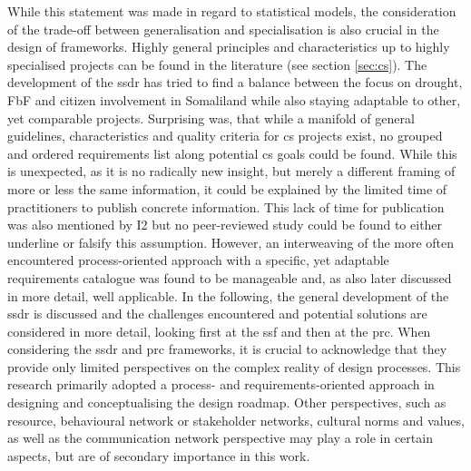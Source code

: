 While this statement was made in regard to statistical models, the consideration of the trade-off between generalisation and specialisation is also crucial in the design of frameworks. Highly general principles and characteristics up to highly specialised projects can be found in the literature (see section \ref{sec:cs}). The development of the \acrshort{ssdr} has tried to find a balance between the focus on drought, FbF and citizen involvement in Somaliland while also staying adaptable to other, yet comparable projects.\newline
Surprising was, that while a manifold of general guidelines, characteristics and quality criteria for \acrlong{cs} projects exist, no grouped and ordered requirements list along potential \acrshort{cs} goals could be found. While this is unexpected, as it is no radically new insight, but merely a different framing of more or less the same information, it could be explained by the limited time of practitioners to publish concrete information. This lack of time for publication was also mentioned by I2 but no peer-reviewed study could be found to either underline or falsify this assumption. However, an interweaving of the more often encountered process-oriented approach with a specific, yet adaptable requirements catalogue was found to be manageable and, as also later discussed in more detail, well applicable.\newline
In the following, the general development of the \acrshort{ssdr} is discussed and the challenges encountered and potential solutions are considered in more detail, looking first at the \acrshort{ssf} and then at the \acrshort{prc}. When considering the \acrshort{ssdr} and \acrshort{prc} frameworks, it is crucial to acknowledge that they provide only limited perspectives on the complex reality of design processes. This research primarily adopted a process- and requirements-oriented approach in designing and conceptualising the design roadmap. Other perspectives, such as resource, behavioural network or stakeholder networks, cultural norms and values, as well as the communication network perspective may play a role in certain aspects, but are of secondary importance in this work.\newline
